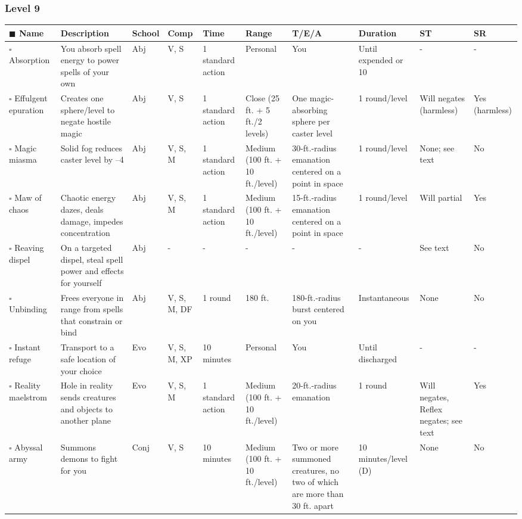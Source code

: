 \documentclass[12pt, a4paper]{article}
\begin{document}
\begin{center}
  \subsubsection*{Level 9}
  \begin{longtable}[H]{ p{8em} p{15em} p{2em} p{5em} p{6em} p{6em} p{10em} p{6em} p{5em} p{2em} }
    \(\blacksquare\) \textbf{Name} & \textbf{Description} & \textbf{School} & \textbf{Comp} & \textbf{Time} & \textbf{Range} & \textbf{T/E/A} & \textbf{Duration} & \textbf{ST} & \textbf{SR}\\
    \endhead
    \(\square\) Absorption & You absorb spell energy to power spells of your own & Abj & V, S & 1 standard action & Personal & You & Until expended or 10  & - & -\\
    \(\square\) Effulgent epuration & Creates one sphere/level to negate hostile magic & Abj & V, S & 1 standard action & Close (25 ft. + 5 ft./2 levels) & One magic-absorbing sphere per caster level & 1 round/level & Will negates (harmless) & Yes (harmless)\\
    \(\square\) Magic miasma & Solid fog reduces caster level by –4 & Abj & V, S, M & 1 standard action & Medium (100 ft. + 10 ft./level) & 30-ft.-radius emanation centered on a point in space & 1 round/level & None; see text & No\\
    \(\square\) Maw of chaos & Chaotic energy dazes, deals damage, impedes concentration & Abj & V, S, M & 1 standard action & Medium (100 ft. + 10 ft./level) & 15-ft.-radius emanation centered on a point in space & 1 round/level & Will partial & Yes\\
    \(\square\) Reaving dispel & On a targeted dispel, steal spell power and effects for yourself & Abj & - & - & - & - & - & See text & No\\
    \(\square\) Unbinding & Frees everyone in range from spells that constrain or bind & Abj & V, S, M, DF & 1 round & 180 ft. & 180-ft.-radius burst centered on you & Instantaneous & None & No\\
    \(\square\) Instant refuge & Transport to a safe location of your choice & Evo & V, S, M, XP & 10 minutes & Personal & You & Until discharged & - & -\\
    \(\square\) Reality maelstrom & Hole in reality sends creatures and objects to another plane & Evo & V, S, M & 1 standard action & Medium (100 ft. + 10 ft./level) & 20-ft.-radius emanation  & 1 round & Will negates, Reﬂex negates; see text & Yes\\
    \(\square\) Abyssal army & Summons demons to ﬁght for you & Conj & V, S & 10 minutes & Medium (100 ft. + 10 ft./level) & Two or more summoned creatures, no two of which are more than 30 ft. apart & 10 minutes/level (D) & None & No\\

\end{longtable}
\end{center}
\end{document}
